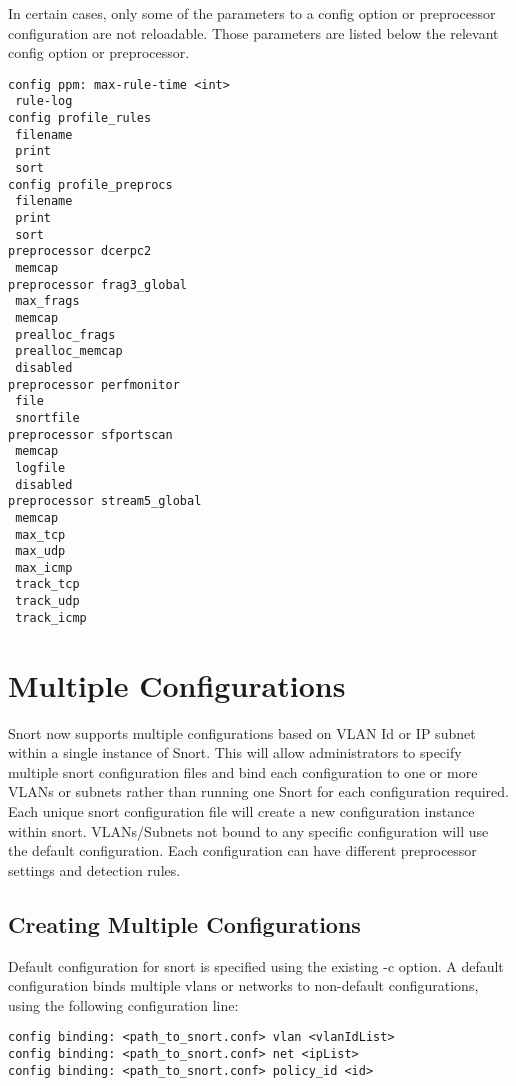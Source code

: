 \documentclass[english]{report}
\begin{document}
In certain cases, only some of the parameters to a config option or
preprocessor configuration are not reloadable.  Those parameters are
listed below the relevant config option or preprocessor.

\begin{verbatim}
config ppm: max-rule-time <int>
 rule-log
config profile_rules
 filename
 print
 sort
config profile_preprocs
 filename
 print
 sort
preprocessor dcerpc2
 memcap
preprocessor frag3_global
 max_frags
 memcap
 prealloc_frags
 prealloc_memcap
 disabled
preprocessor perfmonitor
 file
 snortfile
preprocessor sfportscan
 memcap
 logfile
 disabled
preprocessor stream5_global
 memcap
 max_tcp
 max_udp
 max_icmp
 track_tcp
 track_udp
 track_icmp
\end{verbatim}

\section{Multiple Configurations}

Snort now supports multiple configurations based on VLAN Id or IP subnet within 
a single instance of Snort. This will allow administrators to specify multiple 
snort configuration files and bind each configuration to one or more VLANs or 
subnets rather than running one Snort for each configuration required. Each 
unique snort configuration file will create a new configuration instance within 
snort. VLANs/Subnets not bound to any specific configuration will use the default 
configuration. Each configuration can have different preprocessor settings and 
detection rules.

\subsection{Creating Multiple Configurations}
Default configuration for snort is specified using the existing -c option. A 
default configuration binds multiple vlans or networks to non-default configurations, 
using the following configuration line:

\begin{verbatim}
config binding: <path_to_snort.conf> vlan <vlanIdList>
config binding: <path_to_snort.conf> net <ipList>
config binding: <path_to_snort.conf> policy_id <id>
\end{verbatim}
\end{document}
